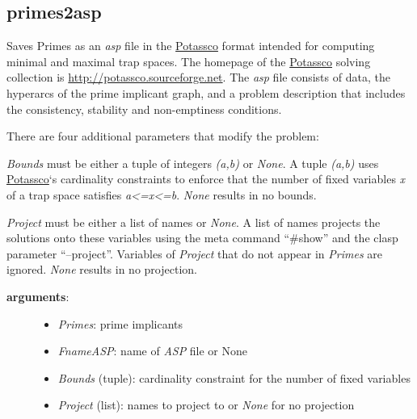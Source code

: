 \documentclass[letterpaper,10pt,english]{sphinxmanual}
\begin{document}
\subsection{primes2asp}
\label{TrapSpaces:id5}\label{TrapSpaces:primes2asp}

\begin{fulllineitems}
\label{TrapSpaces:PyBoolNet.TrapSpaces.primes2asp}
Saves Primes as an \emph{asp} file in the \href{http://potassco.sourceforge.net/}{Potassco} format intended for computing minimal and maximal trap spaces.
The homepage of the \href{http://potassco.sourceforge.net/}{Potassco} solving collection is \href{http://potassco.sourceforge.net}{http://potassco.sourceforge.net}.
The \emph{asp} file consists of data, the hyperarcs of the prime implicant graph,
and a problem description that includes the consistency, stability and non-emptiness conditions.

There are four additional parameters that modify the problem:

\emph{Bounds} must be either a tuple of integers \emph{(a,b)} or \emph{None}.
A tuple \emph{(a,b)} uses \href{http://potassco.sourceforge.net/}{Potassco}`s cardinality constraints to enforce that the number of fixed variables \emph{x} of a trap space satisfies \emph{a\textless{}=x\textless{}=b}.
\emph{None} results in no bounds.

\emph{Project} must be either a list of names or \emph{None}.
A list of names projects the solutions onto these variables using the meta command ``\#show'' and the clasp parameter ``--project''.
Variables of \emph{Project} that do not appear in \emph{Primes} are ignored.
\emph{None} results in no projection.
\begin{description}
\item[{\textbf{arguments}:}] \leavevmode\begin{itemize}
\item {} 
\emph{Primes}: prime implicants

\item {} 
\emph{FnameASP}: name of \emph{ASP} file or None

\item {} 
\emph{Bounds} (tuple): cardinality constraint for the number of fixed variables

\item {} 
\emph{Project} (list): names to project to or \emph{None} for no projection


\end{itemize}
\end{description}
\end{fulllineitems}
\end{document}
